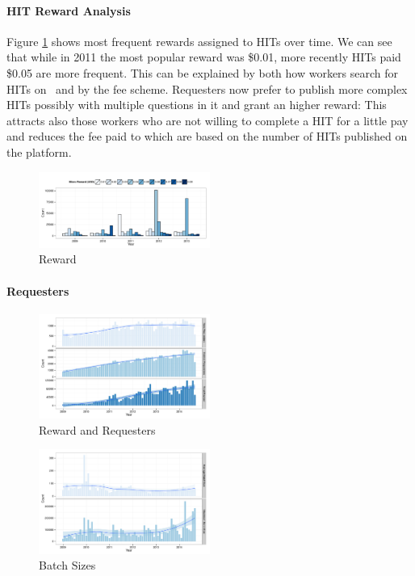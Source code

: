 \paragraph{HIT Reward Analysis}
Figure \ref{fig:reward_year} shows most frequent rewards assigned to HITs over time. We can see that while in 2011 the most popular reward was \$0.01, more recently HITs paid \$0.05 are more frequent. This can be explained by both how workers search for HITs on \amt\ and by the \amt fee scheme. Requesters now prefer to publish more complex HITs possibly with multiple questions in it and grant an higher reward: This attracts also those workers who are not willing to complete a HIT for a little pay and reduces the fee paid to \amt which are based on the number of HITs published on the platform.

\begin{figure}[htbp]
	\centering
		\includegraphics[width=0.5\textwidth]{figures/reward_year}
	\caption{Reward }
	\label{fig:reward_year}
\end{figure}



\paragraph{Requesters }
\begin{figure}[htbp]
	\centering
		\includegraphics[width=0.5\textwidth]{figures/requesters_reward}
	\caption{Reward and Requesters}
	\label{fig:requesters_reward}
\end{figure}





\begin{figure}[htbp]
	\centering
		\includegraphics[width=0.5\textwidth]{figures/batch_size}
	\caption{Batch Sizes}
	\label{fig:batch_size}
\end{figure}


